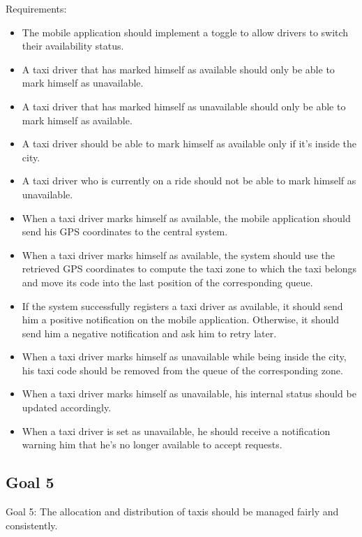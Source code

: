 \documentclass{book}
\begin{document}
Requirements:
\begin{itemize}
\item The mobile application should implement a toggle to allow drivers to switch their availability status.
\item A taxi driver that has marked himself as available should only be able to mark himself as unavailable. 
\item A taxi driver that has marked himself as unavailable should only be able to mark himself as available. 
\item A taxi driver should be able to mark himself as available only if it’s inside the city. 
\item A taxi driver who is currently on a ride should not be able to mark himself as unavailable. 
\item When a taxi driver marks himself as available, the mobile application should send his GPS coordinates to the central system.
\item When a taxi driver marks himself as available, the system should use the retrieved GPS coordinates to compute the taxi zone to which the taxi belongs and move its code into the last position of the corresponding queue. 
\item If the system successfully registers a taxi driver as available, it should send him a positive notification on the mobile application. Otherwise, it should send him a negative notification and ask him to retry later.
\item When a taxi driver marks himself as unavailable while being inside the city, his taxi code should be removed from the queue of the corresponding zone.
\item When a taxi driver marks himself as unavailable, his internal status should be updated accordingly. 
\item When a taxi driver is set as unavailable, he should receive a notification warning him that he’s no longer available to accept requests.
\end{itemize}

\subsection{Goal 5}
Goal 5: The allocation and distribution of taxis should be managed fairly and consistently.
\end{document}
